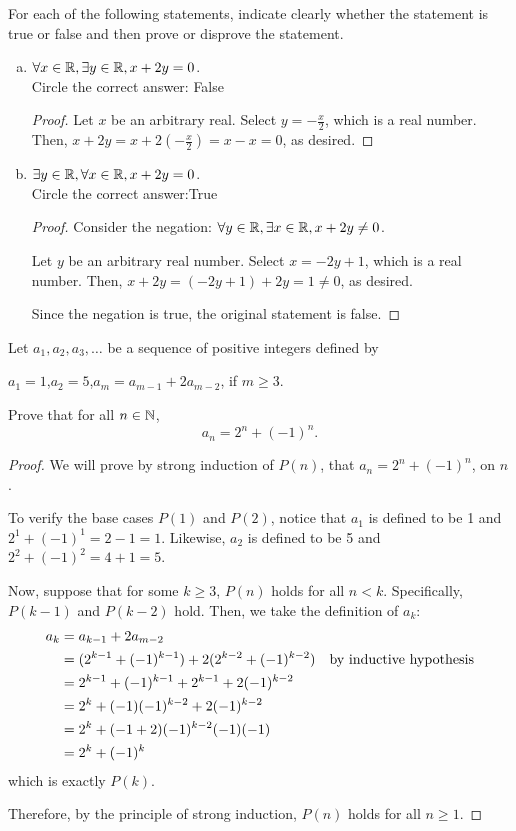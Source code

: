 \documentclass{agony}
\begin{document}
\question For each of the following statements,
indicate clearly whether the statement is true or false and then prove or disprove the statement.
\begin{enumerate}[(a)]
  \item $\forall x\in\mathbb{R}, \exists y\in\mathbb{R}, x+2y=0$. \\
        Circle the correct answer:\quad {} \quad False
        \begin{proof}
          Let $x$ be an arbitrary real.
          Select $y = -\frac{x}{2}$, which is a real number.
          Then, $x+2y = x+2(-\frac{x}{2}) = x-x = 0$, as desired.
        \end{proof}
  \item $\exists y\in\mathbb{R}, \forall x\in\mathbb{R}, x+2y=0$. \\
        Circle the correct answer:\quad True \quad {}
        \begin{proof}
          Consider the negation: $\forall y\in\mathbb{R}, \exists x\in\mathbb{R}, x+2y \neq 0$.

          Let $y$ be an arbitrary real number.
          Select $x = -2y+1$, which is a real number.
          Then, $x+2y = (-2y+1)+2y = 1 \neq 0$, as desired.

          Since the negation is true, the original statement is false.
        \end{proof}
\end{enumerate}


\question Let $a_1,a_2,a_3,\dots$ be a sequence of positive integers defined by
\begin{center}
  $a_1=1$,\quad $a_2=5$,\quad $a_m=a_{m-1}+2a_{m-2}$, if $m \geq 3$.
\end{center}
Prove that for all $n\in\mathbb{N}$, \[ a_n = 2^n + (-1)^n. \]
\begin{proof}
  We will prove by strong induction of $P(n)$, that $a_n=2^n+(-1)^n$, on $n$.

  To verify the base cases $P(1)$ and $P(2)$,
  notice that $a_1$ is defined to be 1 and $2^1+(-1)^1=2-1=1$.
  Likewise, $a_2$ is defined to be 5 and $2^2+(-1)^2=4+1=5$.

  Now, suppose that for some $k \geq 3$, $P(n)$ holds for all $n < k$.
  Specifically, $P(k-1)$ and $P(k-2)$ hold.
  Then, we take the definition of $a_k$:
  \begin{align*}
    a_k & = a_{k-1} + 2a_{m-2}                                 \\
        & = (2^{k-1}+(-1)^{k-1}) + 2(2^{k-2} + (-1)^{k-2}) & \text{by inductive hypothesis} \\
        & = 2^{k-1}+(-1)^{k-1} + 2^{k-1} + 2(-1)^{k-2}         \\
        & = 2^k + (-1)(-1)^{k-2}+ 2(-1)^{k-2}                  \\
        & = 2^k + (-1+2)(-1)^{k-2}(-1)(-1)                     \\
        & = 2^k + (-1)^{k}
  \end{align*}
  which is exactly $P(k)$.

  Therefore, by the principle of strong induction, $P(n)$ holds for all $n \geq 1$.
\end{proof}
\end{document}
